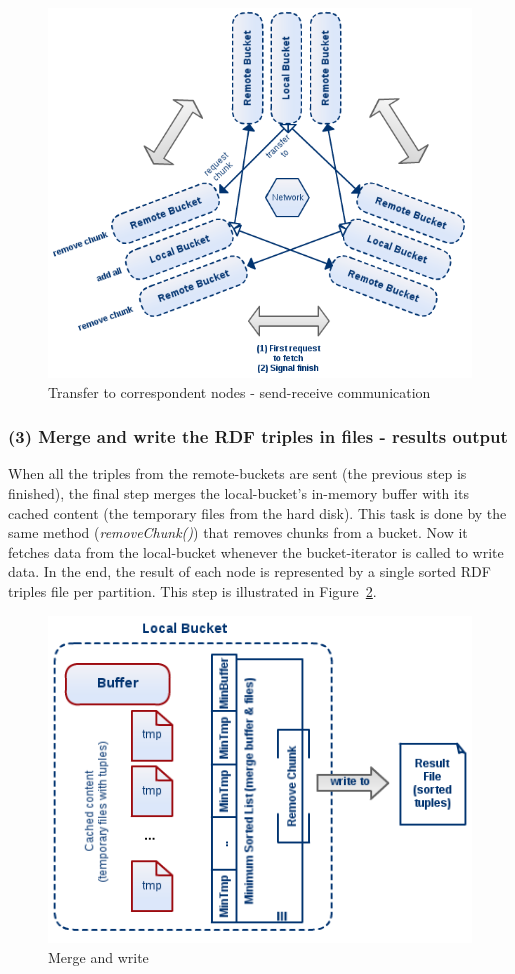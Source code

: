 \begin{figure}
\centering
\includegraphics[scale=0.6]{diag2}
\caption{Transfer to correspondent nodes - send-receive communication}
\label{fig:diag2}
\end{figure}

% 
\subsubsection*{(3) Merge and write the RDF triples in files - results output}

When all the triples from the remote-buckets are sent (the previous step is finished), the final step merges the local-bucket's in-memory buffer with its cached content (the temporary files from the hard disk). This task is done by the same method (\textit{removeChunk()}) that removes chunks from a bucket. Now it fetches data from the local-bucket whenever the bucket-iterator is called to write data. In the end, the result of each node is represented by a single sorted RDF triples file per partition. This step is illustrated in Figure~\ref{fig:diag3}.

\begin{figure}
\centering
\includegraphics[scale=0.5]{diag3}
\caption{Merge and write}
\label{fig:diag3}
\end{figure}

